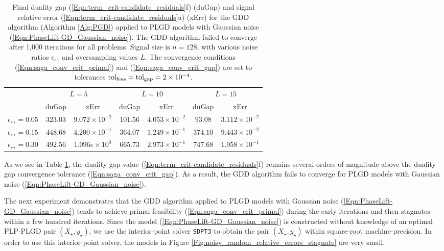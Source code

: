 \begin{table}[H]
\centering
\begin{tabular}{ |c|cc|cc|cc| }
 \hline

 	&	\multicolumn{2}{c|}{$L = 5$}
 		&	\multicolumn{2}{c|}{$L = 10$}
 			&	\multicolumn{2}{c|}{$L = 15$}	\\
 	&	duGap	&	xErr
 		&	duGap	&	xErr
 			&	duGap	&	xErr		\\ 			
 \hline
$\epsilon_\rel = 0.05$
	&	$323.03$ & $9.072 \times 10^{-2}$
		&	$101.56$ & $4.053 \times 10^{-2}$
			&	$93.08$ & $ 3.112 \times 10^{-2}$ \\
$\epsilon_\rel = 0.15$
	&	$448.68$ & $4.200 \times 10^{-1}$
		&	$364.07$ & $1.249 \times 10^{-1}$
			&	$374.10$ & $9.443 \times 10^{-2} $ \\
$\epsilon_\rel = 0.30$
	&	$492.56$ & $1.096e \times 10^{0}$
		&	$665.73$ & $2.973 \times 10^{-1}$
			&	$747.68$ & $1.958 \times 10^{-1}$ \\
 \hline
\end{tabular}
\vspace{0.5cm}
\caption{Final duality gap  (\ref{Eqn:term_crit-candidate_residuals}f) (duGap) and signal relative error (\ref{Eqn:term_crit-candidate_residuals}a) (xErr) for the GDD algorithm (Algorithm \ref{Alg:PGD}) applied to PLGD models with Gaussian noise (\ref{Eqn:PhaseLift-GD_Gaussian_noise}).  The GDD algorithm failed to converge after 1,000 iterations for all problems.  Signal size is $n=128$, with various noise ratios $\epsilon_\rel$ and oversampling values $L$.  The convergence conditions (\ref{Eqn:saga_conv_crit_primal}) and (\ref{Eqn:saga_conv_crit_gap}) are set to tolerances $\textnormal{tol}_\textnormal{feas} = \textnormal{tol}_\textnormal{gap} = 2 \times 10^{-4}$.} \label{Tab:Gaussian_dual_variable_stagnates}
\end{table}

As we see in Table \ref{Tab:Gaussian_dual_variable_stagnates}, the duality gap value (\ref{Eqn:term_crit-candidate_residuals}f) remains several orders of magnitude above the duality gap convergence tolerance (\ref{Eqn:saga_conv_crit_gap}).  As a result, the GDD algorithm fails to converge for PLGD models with Gaussian noise (\ref{Eqn:PhaseLift-GD_Gaussian_noise}).  



The next experiment demonstrates that the GDD algorithm applied to PLGD models with Gaussian noise (\ref{Eqn:PhaseLift-GD_Gaussian_noise}) tends to achieve primal feasibility (\ref{Eqn:saga_conv_crit_primal}) during the early iterations and then stagnates within a few hundred iterations.  Since the model (\ref{Eqn:PhaseLift-GD_Gaussian_noise}) is constructed without knowledge of an optimal PLP-PLGD pair $(X_\star, y_\star)$, we use the interior-point solver \texttt{SDPT3} \cite{toh1999sdpt3} to obtain the pair $(X_\star, y_\star)$ within square-root machine-precision.  In order to use this interior-point solver, the models in Figure \ref{Fig:noisy_random_relative_errors_stagnate} are very small.


